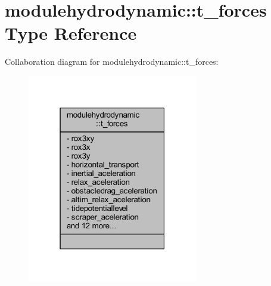 \hypertarget{structmodulehydrodynamic_1_1t__forces}{}\section{modulehydrodynamic\+:\+:t\+\_\+forces Type Reference}
\label{structmodulehydrodynamic_1_1t__forces}


Collaboration diagram for modulehydrodynamic\+:\+:t\+\_\+forces\+:\nopagebreak
\begin{figure}[H]
\begin{center}
\leavevmode
\includegraphics[width=211pt]{structmodulehydrodynamic_1_1t__forces__coll__graph}
\end{center}
\end{figure}
